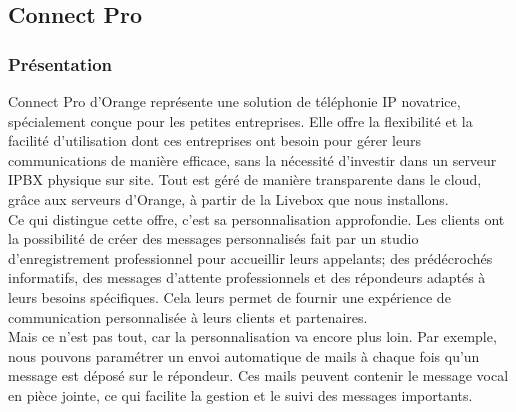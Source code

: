 \documentclass[12pt, a4paper]{article}
\begin{document}
\subsection{Connect Pro}
\subsubsection{Présentation}
Connect Pro d'Orange représente une solution
de téléphonie IP novatrice, spécialement conçue pour
les petites entreprises. Elle offre la flexibilité et
la facilité d'utilisation dont ces entreprises ont
besoin pour gérer leurs communications de manière
efficace, sans la nécessité d'investir dans un
serveur IPBX physique sur site. Tout est géré de
manière transparente dans le cloud, grâce aux
serveurs d'Orange, à partir de la Livebox
que nous installons.\\

Ce qui distingue cette offre, c'est sa
personnalisation approfondie. Les clients ont
la possibilité de créer des messages personnalisés 
fait par un studio d'enregistrement professionnel 
pour accueillir leurs appelants; des prédécrochés
informatifs, des messages d'attente professionnels
et des répondeurs adaptés à leurs besoins spécifiques.
Cela leurs permet de fournir une expérience de
communication personnalisée à leurs clients
et partenaires.\\

Mais ce n'est pas tout, car la personnalisation
va encore plus loin. Par exemple, nous
pouvons paramétrer un envoi automatique de
mails à chaque fois qu'un message est déposé sur
le répondeur. Ces mails peuvent contenir le
message vocal en pièce jointe, ce qui
facilite la gestion et le suivi des messages importants.\\
\end{document}
